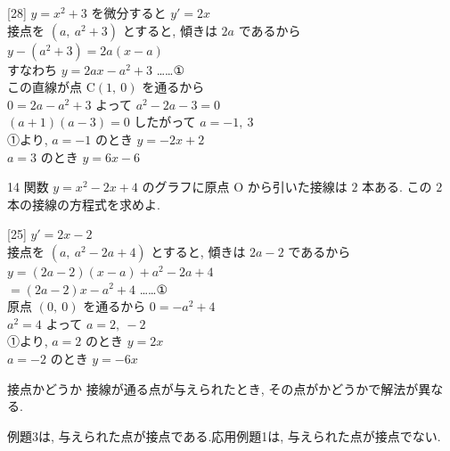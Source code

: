 \documentclass[14pt,dvipdfmx]{jsarticle}
\begin{document}
\vspace{0.15em}
\begin{answerbox}{}[28]
  $y=x^{2}+3$ を微分すると $y'=2x$\\[0.2em]
  接点を $(a,\ a^{2}+3)$ とすると, 傾きは $2a$ であるから\\[0.12em]
  $y-(a^{2}+3)=2a(x-a)$\\[0.12em]
  すなわち $y=2ax-a^{2}+3$ ……①\\[0.28em]
  この直線が点 $\mathrm{C}(1,\ 0)$ を通るから\\[0.12em]
  $0=2a-a^{2}+3$ \quad よって $a^{2}-2a-3=0$\\[0.12em]
  $(a+1)(a-3)=0$ \quad したがって $a=-1,\ 3$\\[0.28em]
  ①より, $a=-1$ のとき $y=-2x+2$\\[0.1em]
  $a=3$ のとき $y=6x-6$
\end{answerbox}

\vfill
\nextpage

\vspace{-1.4zw}%
\begin{practiceprob}{14}
  関数 $y=x^{2}-2x+4$ のグラフに原点 $\mathrm{O}$ から引いた接線は $2$ 本ある.
  この $2$ 本の接線の方程式を求めよ.
\end{practiceprob}
\vspace{0.15em}
\begin{answerbox}{}[25]
  $y'=2x-2$\\[0.15em]
  接点を $(a,\ a^{2}-2a+4)$ とすると, 傾きは $2a-2$ であるから\\[0.1em]
  $y=(2a-2)(x-a)+a^{2}-2a+4$\\[0.12em]
  $=(2a-2)x-a^{2}+4$ ……①\\[0.22em]
  原点 $(0,\ 0)$ を通るから $0=-a^{2}+4$\\[0.1em]
  $a^{2}=4$ \quad よって $a=2,\ -2$\\[0.22em]
  ①より, $a=2$ のとき $y=2x$\\[0.08em]
  $a=-2$ のとき $y=-6x$
\end{answerbox}

\vspace{0.35em}
\begin{techniquebox}{接点かどうか}
  接線が通る点が与えられたとき, その点がかどうかで解法が異なる.

  例題3は, 与えられた点が接点である.\quad 応用例題1は, 与えられた点が接点でない.
\end{techniquebox}
\end{document}
